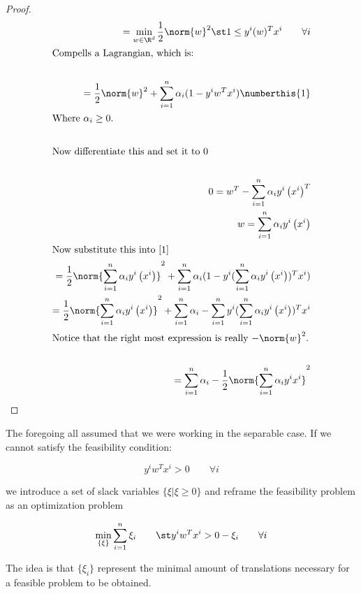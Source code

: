 \documentclass[../main.tex]{subfiles}
\begin{document}
\begin{proof}
    \begin{align*}
                = \min_{w \in \R^d}  \frac{1}{2}\norm{w}^2 \st 1 \leq y^{i}(w)^Tx^{i}  \qquad \forall i \\
                \intertext{Compells a Lagrangian, which is:} \\
                = \frac{1}{2}\norm{w}^2 + \sum_{i=1}^{n}\alpha_i(1 - y^{i}w^Tx^{i}) \numberthis{1} \\
                \intertext{Where $\alpha_{i} \geq 0.$} \\
                \intertext{Now differentiate this and set it to $0$} \\
                0 = w^T - \sum_{i=1}^{n}\alpha_{i}y^{i}\left( x^{i} \right)^T \\
                w = \sum_{i=1}^{n}\alpha_{i}y^{i}\left( x^{i} \right) \\
                \intertext{Now substitute this into \ref{1}}
                = \frac{1}{2}\norm{\sum_{i=1}^{n}\alpha_{i}y^{i}\left( x^{i} \right)}^2 + \sum_{i=1}^{n}\alpha_i(1 - y^{i}(\sum_{i=1}^{n}\alpha_{i}y^{i}\left( x^{i} \right))^Tx^{i}) \\
                = \frac{1}{2}\norm{\sum_{i=1}^{n}\alpha_{i}y^{i}\left( x^{i} \right)}^2 + \sum_{i=1}^{n}\alpha_i - \sum_{i=1}^{n}y^{i}(\sum_{i=1}^{n}\alpha_{i}y^{i}\left( x^{i} \right))^Tx^{i} \\
                \intertext{Notice that the right most expression is really $-\norm{w}^2$.}\\
                = \sum_{i=1}^{n}\alpha_i - \frac{1}{2}\norm{\sum_{i=1}^{n}\alpha_iy^{i}x^{i}}^2  \\
    \end{align*}
\end{proof}

\begin{remark}
    The foregoing all assumed that we were working in the separable case. If we cannot satisfy the feasibility condition:

    \[
        y^{i}w^Tx^{i} > 0 \qquad \forall i 
    \]

    we introduce a set of slack variables $\{\xi | \xi \geq 0 \}$ and reframe the feasibility problem as an optimization problem

    \[
        \min_{\{\xi\}} \sum_{i=1}^{n}\xi_{i} \qquad \st y^{i}w^Tx^{i}  > 0 - \xi_{i} \qquad \forall i
    \]

    The idea is that $\{\xi_{i}\}$ represent the minimal amount of translations necessary
    for a feasible problem to be obtained.
\end{remark}
\end{document}

